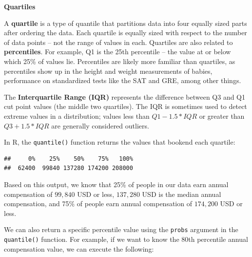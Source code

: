 \documentclass[
]{book}
\newenvironment{Shaded}{\begin{snugshade}}{\end{snugshade}}
\newcommand{\AttributeTok}[1]{\textcolor[rgb]{0.77,0.63,0.00}{#1}}
\newcommand{\CommentTok}[1]{\textcolor[rgb]{0.56,0.35,0.01}{\textit{#1}}}
\newcommand{\DecValTok}[1]{\textcolor[rgb]{0.00,0.00,0.81}{#1}}
\newcommand{\FunctionTok}[1]{\textcolor[rgb]{0.00,0.00,0.00}{#1}}
\newcommand{\NormalTok}[1]{#1}
\newcommand{\SpecialCharTok}[1]{\textcolor[rgb]{0.00,0.00,0.00}{#1}}
\begin{document}
\textbf{Quartiles}

A \textbf{quartile} is a type of quantile that partitions data into four equally sized parts after ordering the data. Each quartile is equally sized with respect to the number of data points -- not the range of values in each. Quartiles are also related to \textbf{percentiles}. For example, Q1 is the 25th percentile -- the value at or below which 25\% of values lie. Percentiles are likely more familiar than quartiles, as percentiles show up in the height and weight measurements of babies, performance on standardized tests like the SAT and GRE, among other things.

The \textbf{Interquartile Range (IQR)} represents the difference between Q3 and Q1 cut point values (the middle two quartiles). The IQR is sometimes used to detect extreme values in a distribution; values less than \(Q1 - 1.5 * IQR\) or greater than \(Q3 + 1.5 * IQR\) are generally considered outliers.

In R, the \texttt{quantile()} function returns the values that bookend each quartile:

\begin{Shaded}
\end{Shaded}

\begin{verbatim}
##     0%    25%    50%    75%   100% 
##  62400  99840 137280 174200 208000
\end{verbatim}

Based on this output, we know that 25\% of people in our data earn annual compensation of \(99,840\) USD or less, \(137,280\) USD is the median annual compensation, and 75\% of people earn annual compensation of \(174,200\) USD or less.

We can also return a specific percentile value using the \texttt{probs} argument in the \texttt{quantile()} function. For example, if we want to know the 80th percentile annual compensation value, we can execute the following:

\begin{Shaded}
\end{Shaded}
\end{document}
